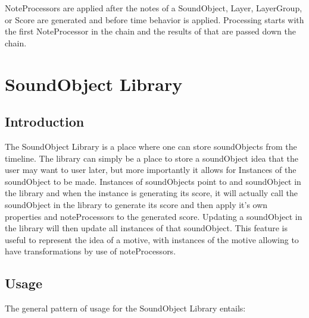 NoteProcessors are applied after the notes of a SoundObject, Layer,
LayerGroup, or Score are generated and before time behavior is applied.
Processing starts with the first NoteProcessor in the chain and the
results of that are passed down the chain.

\section{SoundObject Library}\label{soundObjectLibrary}

\subsection{Introduction}

The SoundObject Library is a place where one can store soundObjects from
the timeline. The library can simply be a place to store a soundObject
idea that the user may want to user later, but more importantly it
allows for Instances of the soundObject to be made. Instances of
soundObjects point to and soundObject in the library and when the
instance is generating its score, it will actually call the soundObject
in the library to generate its score and then apply it's own properties
and noteProcessors to the generated score. Updating a soundObject in the
library will then update all instances of that soundObject. This feature
is useful to represent the idea of a motive, with instances of the
motive allowing to have transformations by use of noteProcessors.

\subsection{Usage}

The general pattern of usage for the SoundObject Library entails:

